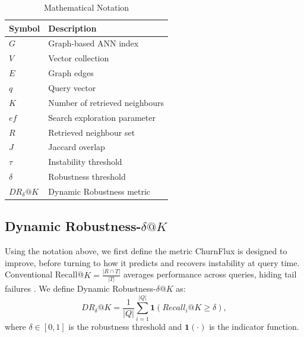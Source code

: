 \documentclass{ieeeaccess}
\begin{document}
\begin{table}[!t]
\centering
\caption{Mathematical Notation}
\label{tab:notation}
\begin{tabular}{ll}
\toprule
Symbol & Description \\
\midrule
$G$ & Graph-based ANN index \\
$V$ & Vector collection \\
$E$ & Graph edges \\
$q$ & Query vector \\
$K$ & Number of retrieved neighbours \\
$ef$ & Search exploration parameter \\
$R$ & Retrieved neighbour set \\
$J$ & Jaccard overlap \\
$\tau$ & Instability threshold \\
$\delta$ & Robustness threshold \\
$DR_{\delta}@K$ & Dynamic Robustness metric \\
\bottomrule
\end{tabular}
\end{table}

\subsection{Dynamic Robustness-$\delta@K$}
Using the notation above, we first define the metric ChurnFlux is designed to improve, before turning to how it predicts and recovers instability at query time. Conventional Recall@$K = \frac{|R\cap T|}{|T|}$ averages performance across queries, hiding tail failures \cite{Robust2025}. We define Dynamic Robustness-$\delta@K$ as:
\begin{equation}
DR_{\delta}@K = \frac{1}{|Q|}\sum_{i=1}^{|Q|} \mathbf{1}\left(Recall_i@K \ge \delta\right),
\label{eq:dr}
\end{equation}
where $\delta\in[0,1]$ is the robustness threshold and $\mathbf{1}(\cdot)$ is the indicator function.
\end{document}
